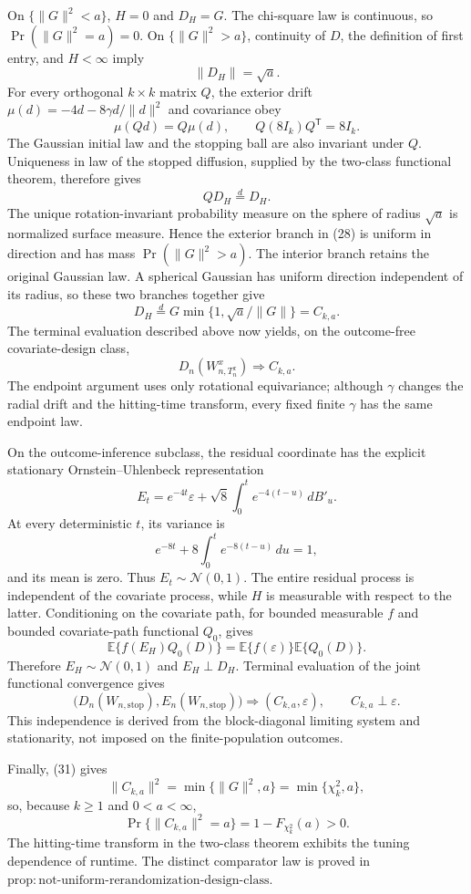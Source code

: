 On \(\{\|G\|^2<a\}\), \(H=0\) and \(D_H=G\).  The chi-square law is continuous, so \(\Pr(\|G\|^2=a)=0\).  On \(\{\|G\|^2>a\}\), continuity of \(D\), the definition of first entry, and \(H<\infty\) imply
\[
 \|D_H\|=\sqrt a. \tag{28}
\]
For every orthogonal \(k\times k\) matrix \(Q\), the exterior drift \(\mu(d)=-4d-8\gamma d/\|d\|^2\) and covariance obey
\[
 \mu(Qd)=Q\mu(d),\qquad Q(8I_k)Q^{\mathsf T}=8I_k. \tag{29}
\]
The Gaussian initial law and the stopping ball are also invariant under \(Q\).  Uniqueness in law of the stopped diffusion, supplied by the two-class functional theorem, therefore gives
\[
 QD_H\overset d=D_H. \tag{30}
\]
The unique rotation-invariant probability measure on the sphere of radius \(\sqrt a\) is normalized surface measure.  Hence the exterior branch in (28) is uniform in direction and has mass \(\Pr(\|G\|^2>a)\).  The interior branch retains the original Gaussian law.  A spherical Gaussian has uniform direction independent of its radius, so these two branches together give
\[
 D_H\overset d=G\min\{1,\sqrt a/\|G\|\}=C_{k,a}. \tag{31}
\]
The terminal evaluation described above now yields, on the outcome-free covariate-design class,
\[
 D_n(W^x_{n,T_n^x})\Rightarrow C_{k,a}. \tag{32}
\]
The endpoint argument uses only rotational equivariance; although \(\gamma\) changes the radial drift and the hitting-time transform, every fixed finite \(\gamma\) has the same endpoint law.

On the outcome-inference subclass, the residual coordinate has the explicit stationary Ornstein--Uhlenbeck representation
\[
 E_t=e^{-4t}\varepsilon+\sqrt8\int_0^t e^{-4(t-u)}\,dB'_u. \tag{33}
\]
At every deterministic \(t\), its variance is
\[
 e^{-8t}+8\int_0^t e^{-8(t-u)}\,du=1, \tag{34}
\]
and its mean is zero.  Thus \(E_t\sim\mathcal N(0,1)\).  The entire residual process is independent of the covariate process, while \(H\) is measurable with respect to the latter.  Conditioning on the covariate path, for bounded measurable \(f\) and bounded covariate-path functional \(Q_0\), gives
\[
 \mathbb E\{f(E_H)Q_0(D)\}
 =\mathbb E\{f(\varepsilon)\}\mathbb E\{Q_0(D)\}. \tag{35}
\]
Therefore \(E_H\sim\mathcal N(0,1)\) and \(E_H\perp D_H\).  Terminal evaluation of the joint functional convergence gives
\[
 \bigl(D_n(W_{n,\mathrm{stop}}),E_n(W_{n,\mathrm{stop}})\bigr)
 \Rightarrow(C_{k,a},\varepsilon),
 \qquad C_{k,a}\perp\varepsilon. \tag{36}
\]
This independence is derived from the block-diagonal limiting system and stationarity, not imposed on the finite-population outcomes.

Finally, (31) gives
\[
 \|C_{k,a}\|^2=\min\{\|G\|^2,a\}=\min\{\chi_k^2,a\}, \tag{37}
\]
so, because \(k\ge1\) and \(0<a<\infty\),
\[
 \Pr\{\|C_{k,a}\|^2=a\}=1-F_{\chi_k^2}(a)>0. \tag{38}
\]
The hitting-time transform in the two-class theorem exhibits the tuning dependence of runtime.  The distinct comparator law is proved in \(\mathrm{prop{:}not\mbox{-}uniform\mbox{-}rerandomization\mbox{-}design\mbox{-}class}\).

